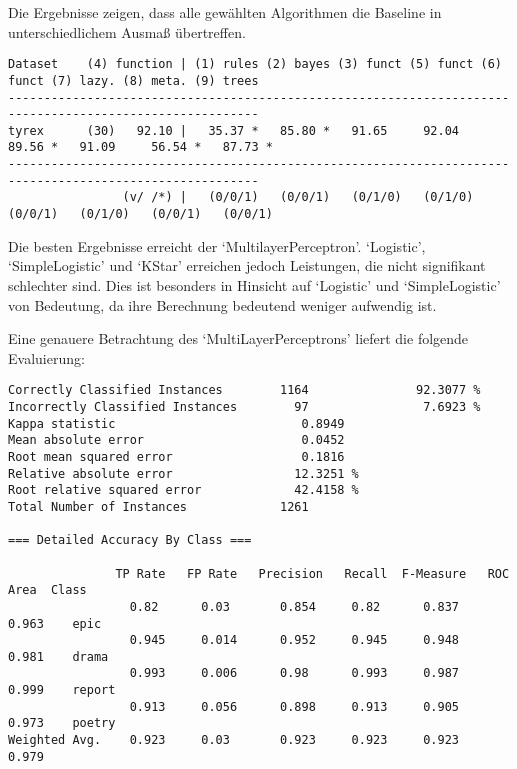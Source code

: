 \documentclass[]{article}
\begin{document}
Die Ergebnisse zeigen, dass alle gewählten Algorithmen die Baseline in
unterschiedlichem Ausmaß übertreffen.

\begin{footnotesize}
\vspace{4 mm}\begin{verbatim}
Dataset    (4) function | (1) rules (2) bayes (3) funct (5) funct (6) funct (7) lazy. (8) meta. (9) trees
---------------------------------------------------------------------------------------------------------
tyrex      (30)   92.10 |   35.37 *   85.80 *   91.65     92.04     89.56 *   91.09     56.54 *   87.73 *
---------------------------------------------------------------------------------------------------------
                (v/ /*) |   (0/0/1)   (0/0/1)   (0/1/0)   (0/1/0)   (0/0/1)   (0/1/0)   (0/0/1)   (0/0/1)
\end{verbatim}\vspace{4 mm}

\end{footnotesize}

Die besten Ergebnisse erreicht der `MultilayerPerceptron'. `Logistic',
`SimpleLogistic' und `KStar' erreichen jedoch Leistungen, die nicht
signifikant schlechter sind. Dies ist besonders in Hinsicht auf
`Logistic' und `SimpleLogistic' von Bedeutung, da ihre Berechnung
bedeutend weniger aufwendig ist.

Eine genauere Betrachtung des `MultiLayerPerceptrons' liefert die
folgende Evaluierung:

\vspace{4 mm}\begin{verbatim}
Correctly Classified Instances        1164               92.3077 %
Incorrectly Classified Instances        97                7.6923 %
Kappa statistic                          0.8949
Mean absolute error                      0.0452
Root mean squared error                  0.1816
Relative absolute error                 12.3251 %
Root relative squared error             42.4158 %
Total Number of Instances             1261     

=== Detailed Accuracy By Class ===

               TP Rate   FP Rate   Precision   Recall  F-Measure   ROC Area  Class
                 0.82      0.03       0.854     0.82      0.837      0.963    epic
                 0.945     0.014      0.952     0.945     0.948      0.981    drama
                 0.993     0.006      0.98      0.993     0.987      0.999    report
                 0.913     0.056      0.898     0.913     0.905      0.973    poetry
Weighted Avg.    0.923     0.03       0.923     0.923     0.923      0.979
\end{verbatim}\vspace{4 mm}
\end{document}
